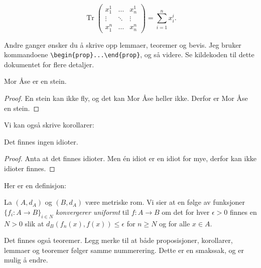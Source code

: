 \documentclass[a4paper, norsk]{article}  %
\DeclareMathOperator{\tr}{Tr}
\begin{document}
\[
\tr \begin{pmatrix}
x_1^1 & \hdots & x_n^1 \\
\vdots & \ddots &  \vdots \\
x_1^n & \hdots & x_n^n
\end{pmatrix} = \sum_{i=1}^n x_i^i.
\]

Andre ganger ønsker du å skrive opp lemmaer, teoremer og bevis. Jeg bruker kommandoene \verb|\begin{prop}...\end{prop}|, og så videre. Se kildekoden til dette dokumentet for flere detaljer.

\begin{prop}
\label{propmorase}
Mor Åse er en stein.
\end{prop}
\begin{proof}
En stein kan ikke fly, og det kan Mor Åse heller ikke. Derfor er Mor Åse en stein.
\end{proof}

Vi kan også skrive korollarer:

\begin{corr}
Det finnes ingen idioter.
\end{corr}
\begin{proof}
Anta at det finnes idioter. Men én idiot er en idiot for mye, derfor kan ikke idioter finnes.
\end{proof}

Her er en definisjon:

\begin{defi}
La $(A,d_A)$ og $(B,d_A)$ være metriske rom. Vi sier at en følge av funksjoner $\{f_i:A \to B \}_{i \in N}$ \emph{konvergerer uniformt} til $f:A \to B$ om det for hver $\epsilon > 0$ finnes en $N > 0$ slik at $d_B(f_n(x),f(x)) \le \epsilon$ for $n \ge N$ og for alle $x \in A$. 
\end{defi}

Det finnes også teoremer. Legg merke til at både proposisjoner, korollarer, lemmaer og teoremer følger samme nummerering. Dette er en smakssak, og er mulig å endre.
\end{document}
